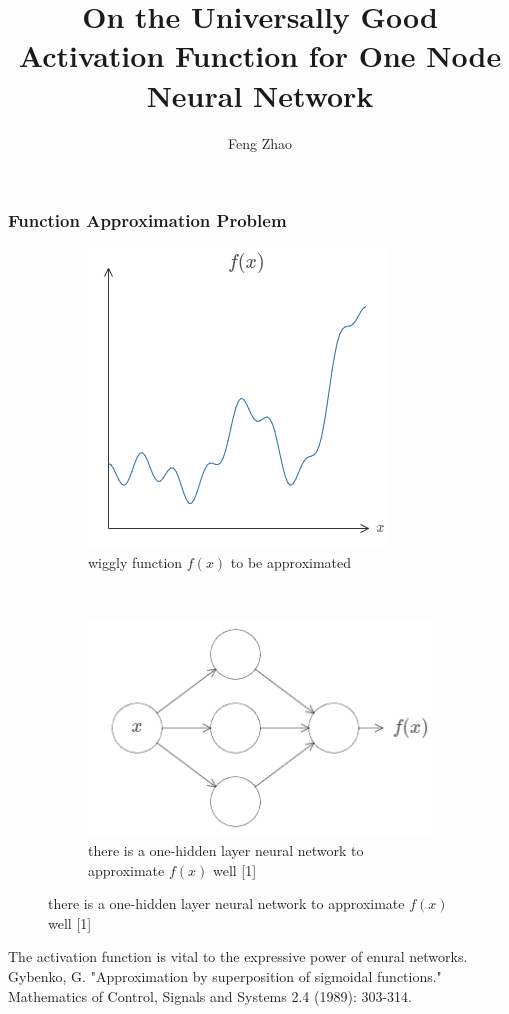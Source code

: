 \documentclass{beamer}
\title{On the Universally Good Activation Function for One Node Neural Network}
\author{Feng Zhao}
\begin{document}
\begin{frame}
	\titlepage
\end{frame}
\begin{frame}
\frametitle{Function Approximation Problem}
\begin{figure}
	\centering
	\begin{subfigure}{0.4\textwidth}
		\includegraphics[width=\textwidth]{f1.png}
		\caption{wiggly function $f(x)$ to be approximated}
	\end{subfigure}~~~~~
	\begin{subfigure}{0.4\textwidth}
		\includegraphics[width=\textwidth]{f2.png}
		\caption{there is a one-hidden layer neural network to approximate $f(x)$ well [1]}
	\end{subfigure}
\end{figure}
The activation function is vital to the expressive power of enural networks.
\vskip 0.7cm
{\tiny Gybenko, G. "Approximation by superposition of sigmoidal functions." Mathematics of Control, Signals and Systems 2.4 (1989):
303-314.}
\end{frame}
\end{document}
